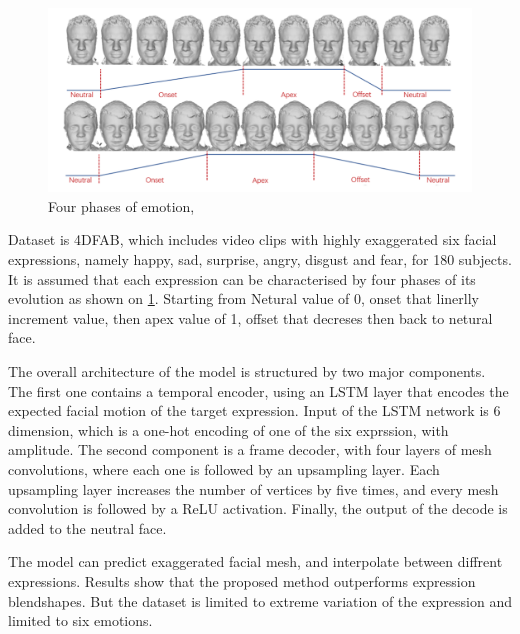 \documentclass[10pt,twocolumn,letterpaper]{article}
\begin{document}



\begin{figure}[t]
   \begin{center}
   \includegraphics[width=0.8\linewidth]{d3dphase.png}
   \end{center}
   \caption{Four phases of emotion, \cite{potamiasLearningGenerateCustomized2020}}
   \label{fig:d3dphase}
 \end{figure}

Dataset is 4DFAB\cite{cheng4DFABLargeScale2018a}, which includes video clips with highly exaggerated six facial expressions, namely happy, sad, surprise, angry, disgust and fear, for 180 subjects. It is assumed that each expression can be characterised by four phases of its evolution as shown on \ref{fig:d3dphase}. Starting from Netural value of 0, onset that linerlly increment value, then apex value of 1, offset that decreses then back to netural face.

The overall architecture of the model is structured by two major components. The first one contains a temporal encoder, using an LSTM layer that encodes the expected facial motion of the target expression. Input of the LSTM network is 6 dimension, which is a one-hot encoding of one of the six exprssion, with amplitude. The second component is a frame decoder, with four layers of mesh convolutions, where each one is followed by an upsampling layer. Each upsampling layer increases the number of vertices by five times, and every mesh convolution is followed by a ReLU activation. Finally, the output of the decode is added to the neutral face.

The model can predict exaggerated facial mesh, and interpolate between  diffrent expressions. Results show that the proposed method outperforms expression blendshapes. But the dataset is limited to extreme variation of the expression and limited to six emotions.


\end{document}
